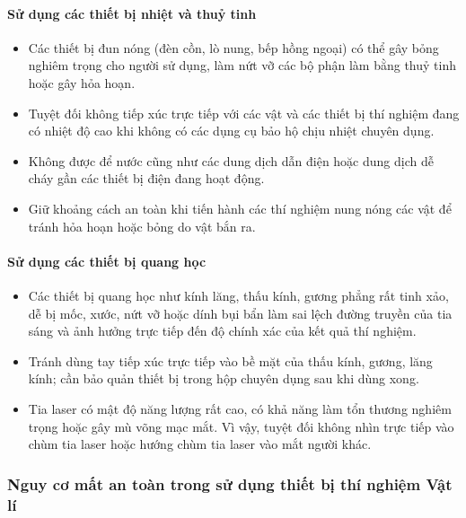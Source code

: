 \paragraph{Sử dụng các thiết bị nhiệt và thuỷ tinh}
\begin{itemize}
	\item Các thiết bị đun nóng (đèn cồn, lò nung, bếp hồng ngoại) có thể gây bỏng nghiêm trọng cho người sử dụng, làm nứt vỡ các bộ phận làm bằng thuỷ tinh hoặc gây hỏa hoạn.
	\item Tuyệt đối không tiếp xúc trực tiếp với các vật và các thiết bị thí nghiệm đang có nhiệt độ cao khi không có các dụng cụ bảo hộ chịu nhiệt chuyên dụng.
	\item Không được để nước cũng như các dung dịch dẫn điện hoặc dung dịch dễ cháy gần các thiết bị điện đang hoạt động.
	\item Giữ khoảng cách an toàn khi tiến hành các thí nghiệm nung nóng các vật để tránh hỏa hoạn hoặc bỏng do vật bắn ra.
\end{itemize}

\paragraph{Sử dụng các thiết bị quang học}
\begin{itemize}
	\item Các thiết bị quang học như kính lăng, thấu kính, gương phẳng rất tinh xảo, dễ bị mốc, xước, nứt vỡ hoặc dính bụi bẩn làm sai lệch đường truyền của tia sáng và ảnh hưởng trực tiếp đến độ chính xác của kết quả thí nghiệm.
	\item Tránh dùng tay tiếp xúc trực tiếp vào bề mặt của thấu kính, gương, lăng kính; cần bảo quản thiết bị trong hộp chuyên dụng sau khi dùng xong.
	\item Tia laser có mật độ năng lượng rất cao, có khả năng làm tổn thương nghiêm trọng hoặc gây mù võng mạc mắt. Vì vậy, tuyệt đối không nhìn trực tiếp vào chùm tia laser hoặc hướng chùm tia laser vào mắt người khác.
\end{itemize}

\subsubsection{Nguy cơ mất an toàn trong sử dụng thiết bị thí nghiệm Vật lí}

